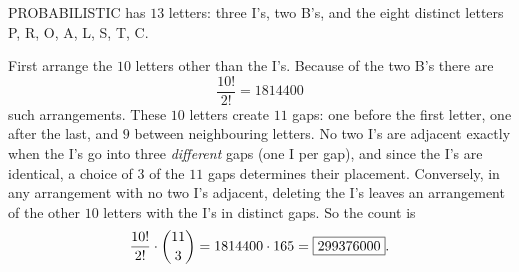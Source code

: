 PROBABILISTIC has $13$ letters: three I's, two B's, and the eight distinct letters P, R, O, A, L, S, T, C.

First arrange the $10$ letters other than the I's. Because of the two B's there are
\[
\dfrac{10!}{2!}=1814400
\]
such arrangements. These $10$ letters create $11$ gaps: one before the first letter, one after the last, and $9$ between neighbouring letters. No two I's are adjacent exactly when the I's go into three \emph{different} gaps (one I per gap), and since the I's are identical, a choice of $3$ of the $11$ gaps determines their placement. Conversely, in any arrangement with no two I's adjacent, deleting the I's leaves an arrangement of the other $10$ letters with the I's in distinct gaps. So the count is
\[
\dfrac{10!}{2!}\cdot\dbinom{11}{3}=1814400\cdot165=\boxed{299376000}.
\]

